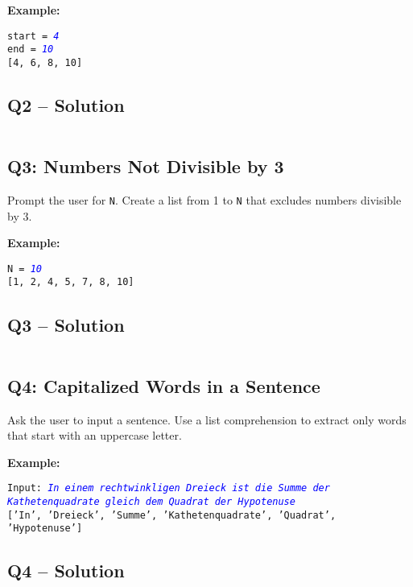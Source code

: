 \documentclass[a4paper,11pt]{article}
\begin{document}
\textbf{Example:}
\begin{flushleft}
	\texttt{start = \textcolor{blue}{\textit{4}}}\\
	\texttt{end = \textcolor{blue}{\textit{10}}}\\
	\texttt{[4, 6, 8, 10]}
\end{flushleft}


\subsection*{Q2 – Solution}
\inputminted{python}{Files/11/2.py}


\subsection*{Q3: Numbers Not Divisible by 3}
Prompt the user for \texttt{N}. Create a list from 1 to \texttt{N} that excludes numbers divisible by 3.

\textbf{Example:}
\begin{flushleft}
	\texttt{N = \textcolor{blue}{\textit{10}}}\\
	\texttt{[1, 2, 4, 5, 7, 8, 10]}
\end{flushleft}

\subsection*{Q3 – Solution}
\inputminted{python}{Files/11/3.py}

\subsection*{Q4: Capitalized Words in a Sentence}
Ask the user to input a sentence. Use a list comprehension to extract only words that start with an uppercase letter.

\textbf{Example:}
\begin{flushleft}
	\texttt{Input: \textcolor{blue}{\textit{In einem rechtwinkligen Dreieck ist die Summe der Kathetenquadrate gleich dem Quadrat der Hypotenuse}}}\\
	\texttt{['In', 'Dreieck', 'Summe', 'Kathetenquadrate', 'Quadrat', 'Hypotenuse']}
\end{flushleft}

\subsection*{Q4 – Solution}
\inputminted{python}{Files/11/4.py}
\end{document}
